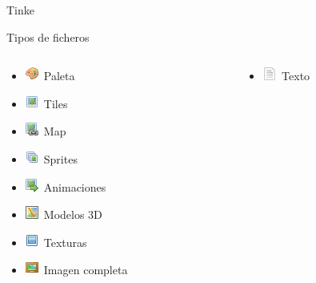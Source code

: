 \begin{frame}{Tinke}
\end{frame}

\begin{frame}{Tipos de ficheros}
    \begin{columns}
    \begin{column}{0.5\textwidth}
        \begin{itemize}
            \item \includegraphics{imgs/palette.png}~Paleta
            \item \includegraphics{imgs/picture.png}~Tiles
            \item \includegraphics{imgs/picture_link.png}~Map
            \item \includegraphics{imgs/pictures.png}~Sprites
            \item \includegraphics{imgs/picture_go.png}~Animaciones
            \item \includegraphics{imgs/map.png}~Modelos 3D
            \item \includegraphics{imgs/image.png}~Texturas
            \item \includegraphics{imgs/photo.png}~Imagen completa
        \end{itemize}
    \end{column}
    \hfill
    \begin{column}{0.5\textwidth}
        \begin{itemize}
            \item \includegraphics{imgs/page_white_text.png}~Texto

\end{itemize}
\end{column}
\end{columns}
\end{frame}
